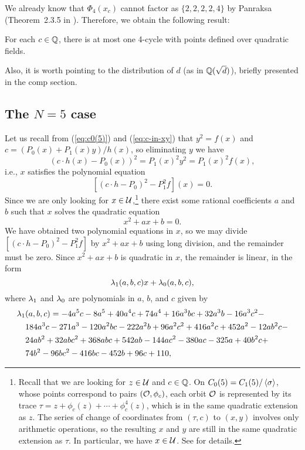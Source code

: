 We already know that $\Phi_4(x_c)$ cannot factor as $\{2,2,2,2,4\}$
by Panraksa (Theorem~2.3.5 in \cite{MR2982105}). Therefore, we
obtain the following result:

\begin{theorem}
  For each $c \in \mathbb{Q}$, there is at most one 4-cycle with points
        defined over quadratic fields.
\end{theorem}

Also, it is worth pointing to the distribution of $d$ (as in
$\mathbb{Q}(\sqrt{d})$), briefly presented in the comp section.

\subsection{The $N = 5$ case}

Let us recall from (\ref{eq:c0(5)}) and (\ref{eq:c-in-xy}) that $y^2 =
f(x)$ and $c = (P_0(x) + P_1(x) y)/h(x)$, so eliminating $y$ we have
\[
(c \cdot h(x) - P_0(x))^2 = P_1(x)^2 y^2 = P_1(x)^2 f(x),
\]
i.e., $x$ satisfies the polynomial equation
\[
[(c \cdot h - P_0)^2 - P_1^2 f](x) = 0.
\]
Since we are only looking for $x \in \mathcal{U}$,\footnote{%
  Recall that we are looking for $z \in \mathcal{U}$ and $c \in \mathbb{Q}$. On $C_0(5)
  = C_1(5) / \left<\sigma\right>$, whose points correspond to pairs $(\mathcal{O},
  \phi_c)$, each orbit $\mathcal{O}$ is represented by its trace $\tau = z +
  \phi_c(z) + \cdots + \phi_c^4(z)$, which is in the same quadratic
  extension as $z$. The series of change of coordinates from $(\tau,
  c)$ to $(x, y)$ involves only arithmetic operations, so the
  resulting $x$ and $y$ are still in the same quadratic extension as
  $\tau$. In particular, we have $x \in \mathcal{U}$. See \cite{MR1480542} for
  details.}
there exist some rational coefficients $a$ and $b$ such that $x$
solves the quadratic equation
\[
x^2 + a x + b = 0.
\]
We have obtained two polynomial equations in $x$, so we may divide
$[(c \cdot h - P_0)^2 - P_1^2 f]$ by $x^2 + ax + b$ using long
division, and the remainder must be zero. Since $x^2 + ax + b$ is
quadratic in $x$, the remainder is linear, in the form
\[
\lambda_1(a, b, c) x + \lambda_0(a, b, c),
\]
where $\lambda_1$ and $\lambda_0$ are polynomials in $a$, $b$, and $c$ given by
\[
\begin{aligned}
  \lambda_1&(a, b, c) = - 4a^5c - 8a^5 + 40a^4c + 74a^4 + 16a^3bc + 32a^3b
  - 16a^3c^2 - \\
  & 184a^3c - 271a^3 - 120a^2bc - 222a^2b + 96a^2c^2 + 416a^2c + 452a^2 -
  12ab^2c - \\
  & 24ab^2 + 32abc^2 + 368abc + 542ab - 144ac^2 - 380ac - 325a + 40b^2c + \\
  & 74b^2 - 96bc^2 - 416bc - 452b + 96c + 110,
\end{aligned}
\]
